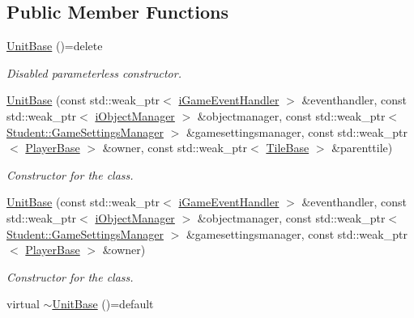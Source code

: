 \subsection*{Public Member Functions}
\begin{DoxyCompactItemize}
\item 
\hypertarget{class_course_1_1_unit_base_a28175446e9c369e755c1e392a1c8c10e}{\hyperlink{class_course_1_1_unit_base_a28175446e9c369e755c1e392a1c8c10e}{Unit\-Base} ()=delete}\label{class_course_1_1_unit_base_a28175446e9c369e755c1e392a1c8c10e}

\begin{DoxyCompactList}\small\item\em Disabled parameterless constructor. \end{DoxyCompactList}\item 
\hyperlink{class_course_1_1_unit_base_a291d6f5b21bfa8d431204ba7a6f81dd6}{Unit\-Base} (const std\-::weak\-\_\-ptr$<$ \hyperlink{class_course_1_1i_game_event_handler}{i\-Game\-Event\-Handler} $>$ \&eventhandler, const std\-::weak\-\_\-ptr$<$ \hyperlink{class_course_1_1i_object_manager}{i\-Object\-Manager} $>$ \&objectmanager, const std\-::weak\-\_\-ptr$<$ \hyperlink{class_student_1_1_game_settings_manager}{Student\-::\-Game\-Settings\-Manager} $>$ \&gamesettingsmanager, const std\-::weak\-\_\-ptr$<$ \hyperlink{class_course_1_1_player_base}{Player\-Base} $>$ \&owner, const std\-::weak\-\_\-ptr$<$ \hyperlink{class_course_1_1_tile_base}{Tile\-Base} $>$ \&parenttile)
\begin{DoxyCompactList}\small\item\em Constructor for the class. \end{DoxyCompactList}\item 
\hyperlink{class_course_1_1_unit_base_a21b3f9039a70b31fb72079c5b5fa9e66}{Unit\-Base} (const std\-::weak\-\_\-ptr$<$ \hyperlink{class_course_1_1i_game_event_handler}{i\-Game\-Event\-Handler} $>$ \&eventhandler, const std\-::weak\-\_\-ptr$<$ \hyperlink{class_course_1_1i_object_manager}{i\-Object\-Manager} $>$ \&objectmanager, const std\-::weak\-\_\-ptr$<$ \hyperlink{class_student_1_1_game_settings_manager}{Student\-::\-Game\-Settings\-Manager} $>$ \&gamesettingsmanager, const std\-::weak\-\_\-ptr$<$ \hyperlink{class_course_1_1_player_base}{Player\-Base} $>$ \&owner)
\begin{DoxyCompactList}\small\item\em Constructor for the class. \end{DoxyCompactList}\item 
\hypertarget{class_course_1_1_unit_base_a7a319a085adb34da50d016418a662f81}{virtual \hyperlink{class_course_1_1_unit_base_a7a319a085adb34da50d016418a662f81}{$\sim$\-Unit\-Base} ()=default}\label{class_course_1_1_unit_base_a7a319a085adb34da50d016418a662f81}


\end{DoxyCompactItemize}
